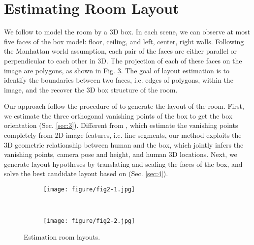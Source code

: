 \section{Estimating Room Layout}
\label{sec:2}

We follow \cite{Hedau_ICCV2009} to model the room by a 3D box. In each scene, we can observe at most five faces of the box model: floor, ceiling, and left, center, right walls. Following the Manhattan world assumption, each pair of the faces are either parallel or perpendicular to each other in 3D. The projection of each of these faces on the image are polygons, as shown in Fig. \ref{fig:f2}. The goal of layout estimation is to identify the boundaries between two faces, i.e. edges of polygons, within the image, and the recover the 3D box structure of the room.

Our approach follow the procedure of \cite{Hedau_ICCV2009,Lee_CVPR2009} to generate the layout of the room. First, we estimate the three orthogonal vanishing points of the box to get the box orientation (Sec. \ref{sec:3}). Different from \cite{Hedau_ICCV2009}, which estimate the vanishing points completely from 2D image features, i.e. line segments, our method exploits the 3D geometric relationship between human and the box, which jointly infers the vanishing points, camera pose and height, and human 3D locations. Next, we generate layout hypotheses by translating and scaling the faces of the box, and solve the best candidate layout based on \cite{Hedau_ICCV2009} (Sec. \ref{sec:4}).

\begin{figure}[t]
  \centering
  \hspace{-7mm}
  \begin{subfigure}[b]{0.21\textwidth}
    \centering
    \texttt{[image: figure/fig2-1.jpg]}
    \label{fig:f2_1}
  \end{subfigure}
  ~
  \begin{subfigure}[b]{0.21\textwidth}
    \centering
    \texttt{[image: figure/fig2-2.jpg]}
    \label{fig:f2_2}
  \end{subfigure}
  \caption{Estimation room layouts.}
  \label{fig:f2}
\end{figure}